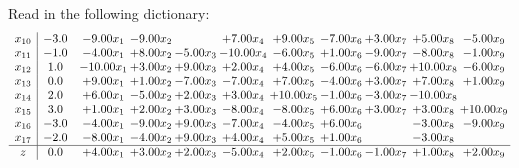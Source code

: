 \documentclass[9pt]{article}
\begin{document}
Read in the following dictionary:
\[\begin{array}{c| c c@{\hskip 2pt} c@{\hskip 2pt} c@{\hskip 2pt} c@{\hskip 2pt} c@{\hskip 2pt} c@{\hskip 2pt} c@{\hskip 2pt} c@{\hskip 2pt} c@{\hskip 2pt} }
 x_{10}   &  -3.0 & -9.00 x_{1} & -9.00 x_{2} &   & +  7.00 x_{4} & +  9.00 x_{5} & -7.00 x_{6} & +  3.00 x_{7} & +  5.00 x_{8} & -5.00 x_{9}\\
 x_{11}   &  -1.0 & -4.00 x_{1} & +  8.00 x_{2} & -5.00 x_{3} & -10.00 x_{4} & -6.00 x_{5} & +  1.00 x_{6} & -9.00 x_{7} & -8.00 x_{8} & -1.00 x_{9}\\
 x_{12}   &  1.0 & -10.00 x_{1} & +  3.00 x_{2} & +  9.00 x_{3} & +  2.00 x_{4} & +  4.00 x_{5} & -6.00 x_{6} & -6.00 x_{7} & + 10.00 x_{8} & -6.00 x_{9}\\
 x_{13}   &  0.0 & +  9.00 x_{1} & +  1.00 x_{2} & -7.00 x_{3} & -7.00 x_{4} & +  7.00 x_{5} & -4.00 x_{6} & +  3.00 x_{7} & +  7.00 x_{8} & +  1.00 x_{9}\\
 x_{14}   &  2.0 & +  6.00 x_{1} & -5.00 x_{2} & +  2.00 x_{3} & +  3.00 x_{4} & + 10.00 x_{5} & -1.00 x_{6} & -3.00 x_{7} & -10.00 x_{8} &   \\
 x_{15}   &  3.0 & +  1.00 x_{1} & +  2.00 x_{2} & +  3.00 x_{3} & -8.00 x_{4} & -8.00 x_{5} & +  6.00 x_{6} & +  3.00 x_{7} & +  3.00 x_{8} & + 10.00 x_{9}\\
 x_{16}   &  -3.0 & -4.00 x_{1} & -9.00 x_{2} & +  9.00 x_{3} & -7.00 x_{4} & -4.00 x_{5} & +  6.00 x_{6} &   & -3.00 x_{8} & -9.00 x_{9}\\
 x_{17}   &  -2.0 & -8.00 x_{1} & -4.00 x_{2} & +  9.00 x_{3} & +  4.00 x_{4} & +  5.00 x_{5} & +  1.00 x_{6} &   & -3.00 x_{8} &   \\
\hline
z    &  0.0 & +  4.00 x_{1} & +  3.00 x_{2} & +  2.00 x_{3} & -5.00 x_{4} & +  2.00 x_{5} & -1.00 x_{6} & -1.00 x_{7} & +  1.00 x_{8} & +  2.00 x_{9}\\
\end{array}\]
\end{document}
